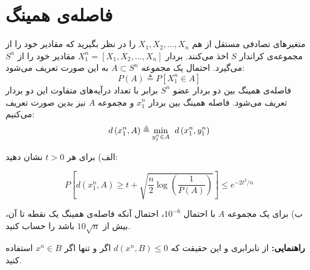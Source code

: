 \section[]{فاصله‌ی همینگ}

متغیرهای تصادفی مستقل از هم 
$X_1, X_2,..., X_n$
 را در نظر بگیرید که مقادیر خود را از مجموعه‌ی کراندار
$S$
 اخذ می‌کنند. بردار
$X_{1}^{n}=[X_1, X_2,..., X_n]$
مقادیر خود را از 
$S^n$
می‌گیرد. احتمال یک مجموعه 
$A\subset S^n$
به این صورت تعریف می‌شود: 
$$P\left(A\right)\triangleq P\left[X_{1}^{n}\in A\right]$$
 فاصله‌ی همینگ بین دو بردار عضو 
$S^n$ 
برابر با تعداد درآیه‌های متفاوت این دو بردار تعریف می‌شود‌.  فاصله همینگ بین بردار 
$x_{1}^{n}$
 و مجموعه 
$A$
نیز بدین صورت تعریف می‌کنیم:
$$d\left(x_{1}^{n},A\right)\triangleq\min_{y_{1}^{n}\in A}\hspace{0.15cm} d\left(x_{1}^{n},y_{1}^{n}\right)$$

الف) برای هر 
$t>0$
نشان دهید:

\[P\left[d\left(x_{1}^{n},A\right)\geq t+\sqrt{\frac{n}{2}\log\left(\frac{1}{P\left(A\right)}\right)}\right]\leq e^{-2t^{2}/n}\]

ب) برای یک مجموعه 
$A$
 با احتمال 
$10^{-6}$،
 احتمال آنکه فاصله‌ی همینگ یک نقطه تا آن، بیش از 
$10\sqrt{n}$
باشد را حساب کنید.

\vspace{0.5cm}
\textbf{راهنمایی:}
 از نابرابری 
و این حقیقت که $d\left(x^{n}, B\right) \leq 0$ اگر و تنها اگر $x^{n} \in B$ استفاده کنید.